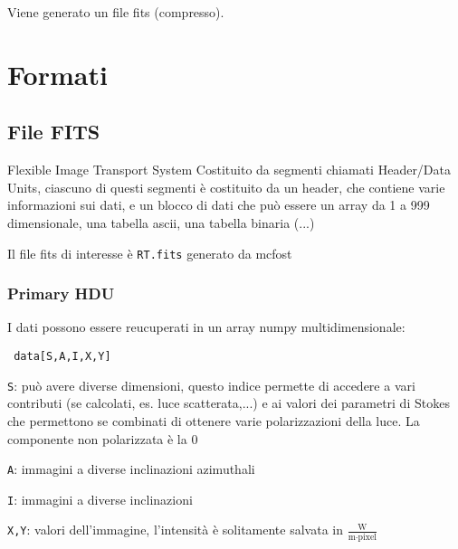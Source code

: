 \documentclass[DIN, pagenumber=false, fontsize=11pt, parskip=half]{scrartcl}
\begin{document}
Viene generato un file fits (compresso).

\section{Formati}

\subsection{File FITS}
Flexible Image Transport System
Costituito da segmenti chiamati Header/Data Units, ciascuno di questi segmenti è costituito da un header, che contiene varie informazioni sui dati, e un blocco di dati che può essere un array da 1 a 999 dimensionale, una tabella ascii, una tabella binaria (...)

Il file fits di interesse è \lstinline{RT.fits} generato da mcfost
\subsubsection{Primary HDU}

I dati possono essere reucuperati in un array numpy multidimensionale:
\begin{lstlisting}
 data[S,A,I,X,Y]
\end{lstlisting}

\lstinline{S}: può avere diverse dimensioni, questo indice permette di accedere a vari contributi (se calcolati, es. luce scatterata,...) e ai valori dei parametri di Stokes che permettono se combinati di ottenere varie polarizzazioni della luce. La componente non polarizzata è la 0

\lstinline{A}: immagini a diverse inclinazioni azimuthali

\lstinline{I}: immagini a diverse inclinazioni

\lstinline{X,Y}: valori dell'immagine, l'intensità è solitamente salvata in $\frac{\text{W}}{\text{m}\cdot \text{pixel}}$
\end{document}
